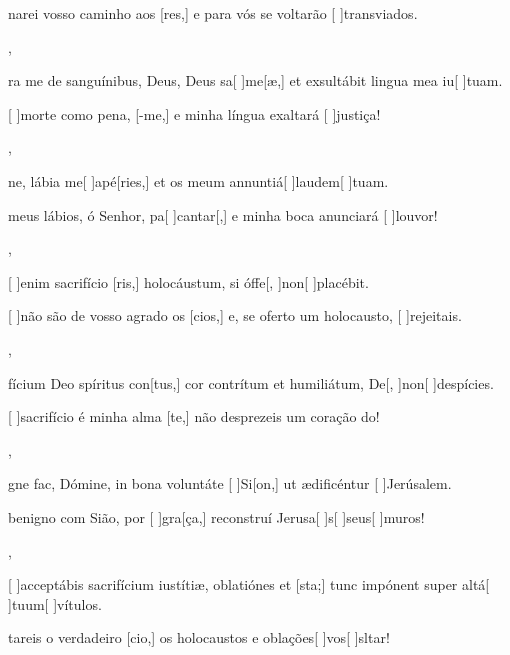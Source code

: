 {    {\item {}narei vosso caminho aos [res,] e para vós se voltarão [ ]{trans}{vi}{a}dos.~\Antiphona},
  {\item {}ra me de sanguínibus, Deus, Deus sa[ ]{me}[\-æ,] et exsultábit lingua mea iu[ ]{tu}am.~\Antiphona}%
    {\item {}[ ]{mor}te como pena, [-me,] e minha língua exaltará [ ]{jus}{ti}ça!~\Antiphona},
  {\item {}ne, lábia me[ ]{a}{pé}[ries,] et os meum annuntiá[ ]{lau}{dem}[ ]{tu}am.~\Antiphona}%
    {\item {} meus lábios, ó Senhor, pa[ ]{can}{tar}[,] e minha boca anunciará [ ]{lou}{vor}!~\Antiphona},
  {\item {}[ ]{e}nim sacrifício [ris,] holocáustum, si óffe[, ]{non}[ ]{pla}{cé}bit.~\Antiphona}%
    {\item {}[ ]{não} são de vosso agrado os [cios,] e, se oferto um holocausto, [ ]{re}{jei}{tais}.~\Antiphona},
  {\item {}fícium Deo spíritus con[tus,] cor contrítum et humiliátum, De[, ]{non}[ ]{de}{spíci}es.~\Antiphona}%
    {\item {}[ ]{sa}crifício é minha alma [te,] não desprezeis um coração do!~\Antiphona},
  {\item {}gne fac, Dómine, in bona voluntáte [ ]{Si}[\-on,] ut ædificéntur [ ]{Je}{rúsa}lem.~\Antiphona}%
    {\item {} benigno com Sião, por [ ]{gra}[ça,] reconstruí Jerusa[ ]{s}[ ]{seus}[ ]{mu}ros!~\Antiphona},
  {\item {}[ ]{ac}ceptábis sacrifícium iustítiæ, oblatiónes et [\-sta;] tunc impónent super altá[ ]{tu}{um}[ ]{vítu}\-los.~\Antiphona}%
    {\item {}tareis o verdadeiro [cio,] os holocaustos e oblações[ ]{vos}[ ]{sl}{tar}!~\Antiphona}
}